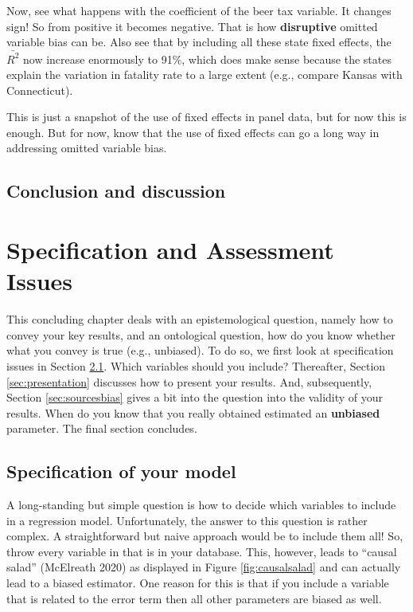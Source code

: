 \documentclass[
]{book}
\begin{document}
Now, see what happens with the coefficient of the beer tax variable. It changes sign! So from positive it becomes negative. That is how \textbf{disruptive} omitted variable bias can be. Also see that by including all these state fixed effects, the \(\bar{R^2}\) now increase enormously to 91\%, which does make sense because the states explain the variation in fatality rate to a large extent (e.g., compare Kansas with Connecticut).

This is just a snapshot of the use of fixed effects in panel data, but for now this is enough. But for now, know that the use of fixed effects can go a long way in addressing omitted variable bias.

\hypertarget{conclusion-and-discussion-2}{%
\section{Conclusion and discussion}\label{conclusion-and-discussion-2}}

\hypertarget{specification}{%
\chapter{Specification and Assessment Issues}\label{specification}}

This concluding chapter deals with an epistemological question, namely how to convey your key results, and an ontological question, how do you know whether what you convey is true (e.g., unbiased). To do so, we first look at specification issues in Section \ref{sec:specificationmodel}. Which variables should you include? Thereafter, Section \ref{sec:presentation} discusses how to present your results. And, subsequently, Section \ref{sec:sourcesbias} gives a bit into the question into the validity of your results. When do you know that you really obtained estimated an \textbf{unbiased} parameter. The final section concludes.

\hypertarget{sec:specificationmodel}{%
\section{Specification of your model}\label{sec:specificationmodel}}

A long-standing but simple question is how to decide which variables to include in a regression model. Unfortunately, the answer to this question is rather complex. A straightforward but naive approach would be to include them all! So, throw every variable in that is in your database. This, however, leads to ``causal salad'' (McElreath 2020) as displayed in Figure \ref{fig:causalsalad} and can actually lead to a biased estimator. One reason for this is that if you include a variable that is related to the error term then all other parameters are biased as well.
\end{document}
